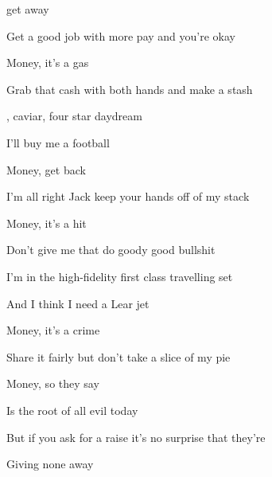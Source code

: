 
\zs

 get away

Get a good job with more pay and you're okay

Money, it's a gas

Grab that cash with both hands and make a stash
\ks

\zr
{}, caviar, four star daydream

 I'll buy me a football 
\kr

\zs
Money, get back

I'm all right Jack keep your hands off of my stack

Money, it's a hit

Don't give me that do goody good bullshit
\ks

\zr
I'm in the high-fidelity first class travelling set

And I think I need a Lear jet
\kr

\zs
Money, it's a crime

Share it fairly but don't take a slice of my pie

Money, so they say

Is the root of all evil today

\ks

\zr
But if you ask for a raise it's no surprise that they're

Giving none away
\kr

\kp





